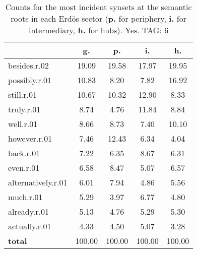 \begin{table}[h!]
\begin{center}
\begin{tabular}{| l || c | c | c | c |}\hline
 & {\bf g.} & {\bf p.} & {\bf i.} & {\bf h.} \\\hline\hline
besides.r.02 & 19.09  & 19.58  & 17.97  & 19.95 \\\hline
possibly.r.01 & 10.83  & 8.20  & 7.82  & 16.92 \\\hline
still.r.01 & 10.67  & 10.32  & 12.90  & 8.33 \\\hline
truly.r.01 & 8.74  & 4.76  & 11.84  & 8.84 \\\hline
well.r.01 & 8.66  & 8.73  & 7.40  & 10.10 \\\hline
however.r.01 & 7.46  & 12.43  & 6.34  & 4.04 \\\hline
back.r.01 & 7.22  & 6.35  & 8.67  & 6.31 \\\hline
even.r.01 & 6.58  & 8.47  & 5.07  & 6.57 \\\hline
alternatively.r.01 & 6.01  & 7.94  & 4.86  & 5.56 \\\hline
much.r.01 & 5.29  & 3.97  & 6.77  & 4.80 \\\hline
already.r.01 & 5.13  & 4.76  & 5.29  & 5.30 \\\hline
actually.r.01 & 4.33  & 4.50  & 5.07  & 3.28 \\\hline\hline
{{\bf total}} & 100.00  & 100.00  & 100.00  & 100.00 \\\hline
\end{tabular}
\caption{Counts for the most incident synsets at the semantic roots in each Erd\"os sector ({\bf p.} for periphery, {\bf i.} for intermediary, {\bf h.} for hubs). Yes. TAG: 6}
\end{center}
\end{table}